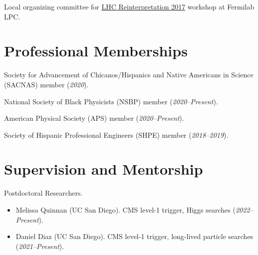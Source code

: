 \documentclass{res}
\newcommand{\MarginText}[1]{\section{#1}\vspace{10pt}}
\begin{document}
\begin{resume}
{    Local organizing committee for \href{https://indico.cern.ch/event/639314/}{LHC Reinterpretation 2017} workshop at Fermilab LPC.

    \MarginText{Professional Memberships}

    Society for Advancement of Chicanos/Hispanics and Native Americans in Science (SACNAS) member (\textit{2020}).

    National Society of Black Physicists (NSBP) member (\textit{2020--Present}).

    American Physical Society (APS) member (\textit{2020--Present}).

    Society of Hispanic Professional Engineers (SHPE) member (\textit{2018--2019}).

  }{}


  \MarginText{Supervision and Mentorship}

  Postdoctoral Researchers.
  \begin{itemize}
    \itemsep-0.3em
    \item Melissa Quinnan (UC San Diego). CMS level-1 trigger, Higgs searches (\textit{2022--Present}).
    \item Daniel Diaz (UC San Diego). CMS level-1 trigger, long-lived particle searches (\textit{2021--Present}).
  \end{itemize}


\end{resume}
\end{document}
